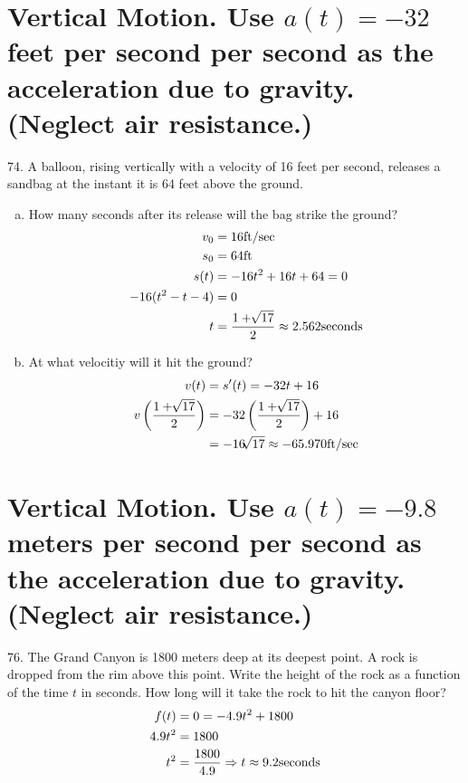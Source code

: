 \documentclass[11pt]{article}
\newcommand*{\set}{\setcounter{equation}{0}}
\begin{document}
\section{Vertical Motion. Use $a(t)=-32$ feet per
second per second as the acceleration due to gravity. (Neglect
air resistance.)}
74. A balloon, rising vertically with a velocity of 16 feet per
second, releases a sandbag at the instant it is 64 feet above the
ground.
\begin{enumerate}[(a)]
    \item How many seconds after its release will the bag strike the
    ground?
        \begin{align}
            \set
            v_0&=16\text{ft}/\text{sec}\\
            s_0&=64\text{ft}\\
            s(t)&=-16t^2+16t+64=0\\
            -16(t^2-t-4)&=0\\
            t&=\frac{1+\sqrt[]{17}}{2}\approx 2.562\text{seconds}\\
        \end{align}
    \item At what velocitiy will it hit the ground?
        \begin{align}
            \set
            v(t)&=s'(t)=-32t+16\\
            v\left(\frac{1+\sqrt[]{17}}{2}\right)&=-32\left(\frac{1+\sqrt[]{17}}{2}\right)+16\\
            &=-16\sqrt[]{17}\approx -65.970\text{ft/sec}
        \end{align}
\end{enumerate}

\section{Vertical Motion. Use $a(t)=-9.8$ meters
per second per second as the acceleration due to gravity.
(Neglect air resistance.)}

76. The Grand Canyon is 1800 meters deep at its deepest point. A
rock is dropped from the rim above this point. Write the height
of the rock as a function of the time $t$ in seconds. How long will
it take the rock to hit the canyon floor?
\begin{align}
    \set
    f(t)&=0=-4.9t^2+1800\\
    4.9t^2&=1800\\
    t^2&=\frac{1800}{4.9}\Rightarrow t\approx 9.2\text{seconds}
\end{align}
\end{document}
